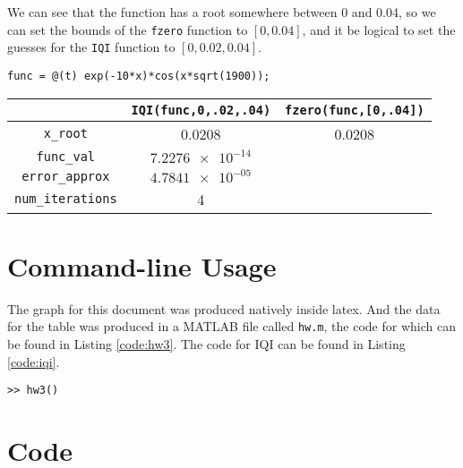 \documentclass[11pt]{article}
\begin{document}
\begin{center}
\end{center}



We can see that the function has a root somewhere between 0 and 0.04, so we can set the bounds of the \texttt{fzero} function to $[0,0.04]$, and it be logical to set the guesses for the \texttt{IQI} function to $[0,0.02,0.04]$.

\begin{center}
\verb|func = @(t) exp(-10*x)*cos(x*sqrt(1900));|
\end{center}

\begin{center}
    \begin{tabular}{c|c|c}
        & \texttt{IQI(func,0,.02,.04)} & \texttt{fzero(func,[0,.04])}\\
        \hline
        \texttt{x\_root} & 0.0208 & 0.0208 \\
        \texttt{func\_val} & $\num{7.2276e-14}$ \\
        \texttt{error\_approx} & $\num{4.7841e-05}$ \\
        \texttt{num\_iterations} & 4
        
    \end{tabular}
\end{center} 

\section{Command-line Usage}
The graph for this document was produced natively inside latex. And the data for the table was produced in a MATLAB file called \texttt{hw.m}, the code for which can be found in Listing \ref{code:hw3}. The code for IQI can be found in Listing \ref{code:iqi}.

\begin{verbatim}
>> hw3()
\end{verbatim}

\section{Code}




\end{document}
